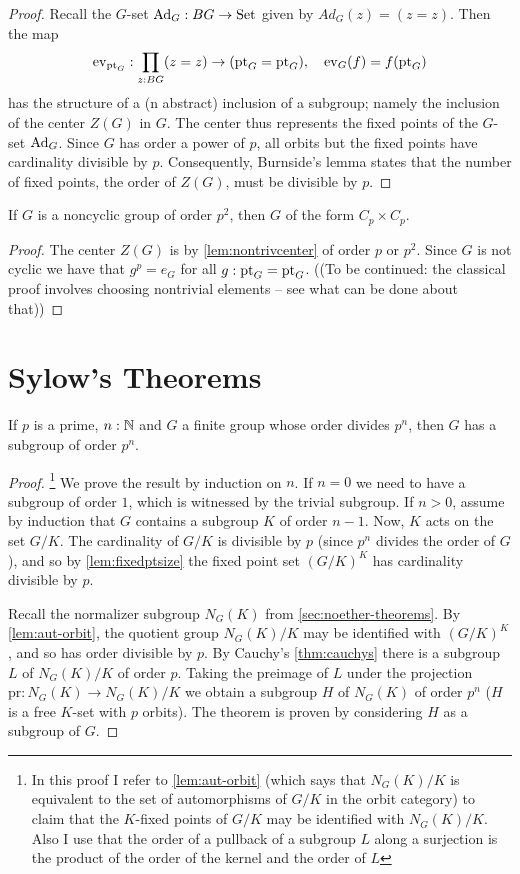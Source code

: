 \begin{proof}
  Recall the $G$-set $\mathrm{Ad}_G:BG\to\mathord{\mathrm{Set}}$ given by $Ad_G(z)=(z=z)$.  Then the map  $$\mathrm{ev}_{{\mathord{\mathrm{pt}}}_G}:\prod_{z:BG}(z=z)\to({\mathord{\mathrm{pt}}}_G={\mathord{\mathrm{pt}}}_G),\quad \mathrm{ev}_G(f)=f({\mathord{\mathrm{pt}}}_G)$$  
has the structure of a (n abstract) inclusion of a subgroup; namely the inclusion of the center $Z(G)$ in $G$.  
The center thus represents the fixed points of the $G$-set $\mathrm{Ad}_G$.  
Since $G$ has order a power of $p$, all orbits but the fixed points have cardinality divisible by $p$.  
Consequently, Burnside's lemma states that the number of fixed points, \ie the order of $Z(G)$, must be divisible by $p$.
\end{proof}
\begin{corollary}
  \label{cor:orderpsquaredgroups}
  If $G$ is a noncyclic group of order $p^2$, then $G$ of the form $C_p\times C_p$.
\end{corollary}
\begin{proof}
  The center $Z(G)$ is by \cref{lem:nontrivcenter} of order $p$ or $p^2$.
  Since $G$ is not cyclic we have that $g^p=e_G$ for all $g:{\mathord{\mathrm{pt}}}_G={\mathord{\mathrm{pt}}}_G$.    
((To be continued: the classical proof involves choosing nontrivial elements  -- see what can be done about that))
\end{proof}
\section{Sylow's Theorems}
\label{sec:sylow}
\begin{theorem}
  \label{thm:sylow1}
  If $p$ is a prime, $n:\mathbb{N}$ and $G$ a finite group whose order divides $p^n$, then $G$ has a subgroup of order $p^n$.
\end{theorem}
\begin{proof}\footnote{In this proof I refer to \cref{lem:aut-orbit} (which says that $N_G(K)/K$ is equivalent to the set of automorphisms of $G/K$ in the orbit category) to claim that the $K$-fixed points of $G/K$ may be identified with $N_G(K)/K$.   Also I use that the order of a pullback of a subgroup $L$ along a surjection is the product of the order of the kernel and the order of $L$}
  We prove the result by induction on $n$.  
If $n=0$ we need to have a subgroup of order $1$, which is witnessed by the trivial subgroup.
If $n>0$, assume by induction that $G$ contains a subgroup $K$ of order $n-1$.  Now, $K$ acts on the set $G/K$.  
The cardinality of $G/K$ is divisible by $p$ (since $p^n$ divides the order of $G$), and so by \cref{lem:fixedptsize} the fixed point set $(G/K)^K$ has cardinality divisible by $p$.  

Recall the normalizer subgroup $N_G(K)$ from \cref{sec:noether-theorems}.
By \cref{lem:aut-orbit}, the quotient group $N_G(K)/K$ may be identified with $(G/K)^K$, and so has order divisible by $p$.  
By Cauchy's \cref{thm:cauchys} there is a subgroup $L$ of $N_G(K)/K$ of order $p$.  
Taking the preimage of $L$ under the projection $\mathrm{pr}:N_G(K)\to N_G(K)/K$ we obtain a subgroup $H$ of $N_G(K)$ of order $p^n$ ($H$ is a free $K$-set with $p$ orbits).  The theorem is proven by considering $H$ as a subgroup of $G$.
\end{proof}



